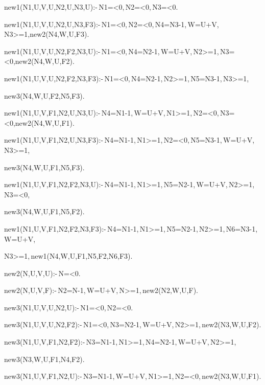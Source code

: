 \documentclass[english]{tlp}
\newcommand{\tts}{\tt \small}
\begin{document}
\smallskip
{\small{\tts{

\noindent
new1(N1,U,V,U,N2,U,N3,U):-\,N1=<0,\,N2=<0,\,N3=<0.

\noindent
new1(N1,U,V,U,N2,U,N3,F3):-\,N1=<0,\,N2=<0,\,N4=N3-1,\,W=U+V,\,N3>=1,new2(N4,W,U,F3).

\noindent             
new1(N1,U,V,U,N2,F2,N3,U):-\,N1=<0,\,N4=N2-1,\,W=U+V,\,N2>=1,\,N3=<0,new2(N4,W,U,F2).
 
\noindent            
new1(N1,U,V,U,N2,F2,N3,F3):-\,N1=<0,\,N4=N2-1,\,N2>=1,\,N5=N3-1,\,N3>=1,\par\hspace{12mm}  
             new3(N4,W,U,F2,N5,F3).

\noindent             
new1(N1,U,V,F1,N2,U,N3,U):-\,N4=N1-1,\,W=U+V,\,N1>=1,\,N2=<0,\,N3=<0,new2(N4,W,U,F1).
 
\noindent            
new1(N1,U,V,F1,N2,U,N3,F3):-\,N4=N1-1,\,N1>=1,\,N2=<0,\,N5=N3-1,\,W=U+V,\,N3>=1,\nopagebreak\par\hspace{12mm}  
             new3(N4,W,U,F1,N5,F3).

\noindent             
new1(N1,U,V,F1,N2,F2,N3,U):-\,N4=N1-1,\,N1>=1,\,N5=N2-1,\,W=U+V,\,N2>=1,\,N3=<0,\nopagebreak\par\hspace{12mm}   
             new3(N4,W,U,F1,N5,F2).

\noindent             
new1(N1,U,V,F1,N2,F2,N3,F3):-\,N4=N1-1,\,N1>=1,\,N5=N2-1,\,N2>=1,\,N6=N3-1,\,W=U+V,
\nopagebreak\par\hspace{12mm} N3>=1,\,new1(N4,W,U,F1,N5,F2,N6,F3).
 
\noindent            
new2(N,U,V,U):-\,N=<0.

\noindent
new2(N,U,V,F):-\,N2=N-1,\,W=U+V,\,N>=1,\,new2(N2,W,U,F).

\noindent
new3(N1,U,V,U,N2,U):-\,N1=<0,\,N2=<0.

\noindent
new3(N1,U,V,U,N2,F2):-\,N1=<0,\,N3=N2-1,\,W=U+V,\,N2>=1,\,new2(N3,W,U,F2).

\noindent
new3(N1,U,V,F1,N2,F2):-\,N3=N1-1,\,N1>=1,\,N4=N2-1,\,W=U+V,\,N2>=1,\par\hspace{12mm} 
             new3(N3,W,U,F1,N4,F2).
             
\noindent
new3(N1,U,V,F1,N2,U):-\,N3=N1-1,\,W=U+V,\,N1>=1,\,N2=<0,\,new2(N3,W,U,F1).


}}} \normalsize
\end{document}
